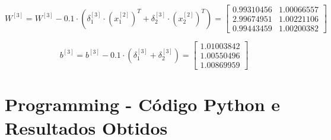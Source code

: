 \documentclass[a4paper,12pt]{article} %
\begin{document}
\begin{enumerate}
\begin{equation*}
    W^{[3]} = W^{[3]} - 0.1 \cdot (\delta^{[3]}_1 \cdot (x^{[2]}_1)^T + \delta^{[3]}_2 \cdot (x^{[2]}_2)^T) = \begin{bmatrix} 0.99310456 & 1.00066557 \\
                                                                                                                            2.99674951 & 1.00221106 \\
                                                                                                                            0.99443459 & 1.00200382 \end{bmatrix}
\end{equation*}

\begin{equation*}
    b^{[3]} = b^{[3]} - 0.1 \cdot (\delta^{[3]}_1 + \delta^{[3]}_2) = \begin{bmatrix} 1.01003842 \\ 1.00550496 \\ 1.00869959 \end{bmatrix}
\end{equation*}

\end{enumerate}

\clearpage
\section*{Programming - Código Python e Resultados Obtidos}
\end{document}
